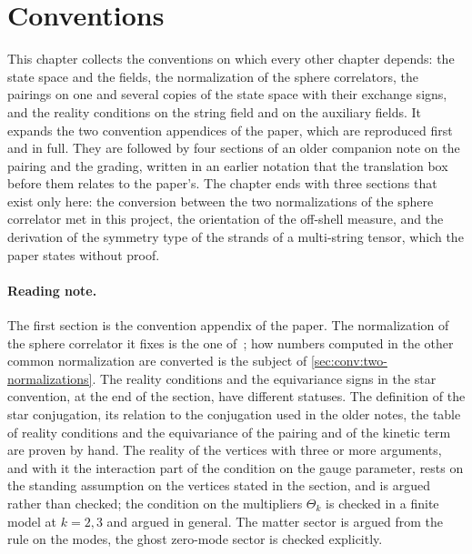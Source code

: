 \section{Conventions}
\label{ch:conventions}

This chapter collects the conventions on which every other chapter depends: the state space and the fields, the normalization of the sphere correlators, the pairings on one and several copies of the state space with their exchange signs, and the reality conditions on the string field and on the auxiliary fields.
It expands the two convention appendices of the paper, which are reproduced first and in full.
They are followed by four sections of an older companion note on the pairing and the grading, written in an earlier notation that the translation box before them relates to the paper's.
The chapter ends with three sections that exist only here: the conversion between the two normalizations of the sphere correlator met in this project, the orientation of the off-shell measure, and the derivation of the symmetry type of the strands of a multi-string tensor, which the paper states without proof.

\paragraph*{Reading note.}
 The first section is the convention appendix of the paper.
The normalization of the sphere correlator it fixes is the one of~\cite{Erbin:2021:StringFieldTheory}; how numbers computed in the other common normalization are converted is the subject of \cref{sec:conv:two-normalizations}.
 The reality conditions and the equivariance signs in the star convention, at the end of the section, have different statuses.
The definition of the star conjugation, its relation to the conjugation used in the older notes, the table of reality conditions and the equivariance of the pairing and of the kinetic term are proven by hand.
The reality of the vertices with three or more arguments, and with it the interaction part of the condition on the gauge parameter, rests on the standing assumption on the vertices stated in the section, and is argued rather than checked; the condition on the multipliers $\Theta_k$ is checked in a finite model at $k = 2, 3$ and argued in general.
The matter sector is argued from the rule on the modes, the ghost zero-mode sector is checked explicitly.

